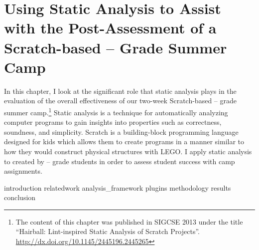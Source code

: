 \chapter{Using Static Analysis to Assist with the Post-Assessment of a
  Scratch-based -- Grade Summer Camp}
\label{chap:hairball}

In this chapter, I look at the significant role that static analysis plays in
the evaluation of the overall effectiveness of our two-week Scratch-based
-- grade summer camp.\footnote{The content of this chapter was
  published in SIGCSE 2013 under the title ``Hairball: Lint-inspired Static
  Analysis of Scratch
  Projects''. \url{http://dx.doi.org/10.1145/2445196.2445265}} Static analysis
is a technique for automatically analyzing computer programs to gain insights
into properties such as correctness, soundness, and simplicity. Scratch is a
building-block programming language designed for kids which allows them to
create programs in a manner similar to how they would construct physical
structures with LEGO\textregistered{}. I apply static analysis to 
created by -- grade students in order to assess student success
with camp assignments.

\iffull
\def\currentprefix{hairball}
{introduction}
{relatedwork}
{analysis_framework}
{plugins}
{methodology}
{results}
{conclusion}
\fi
